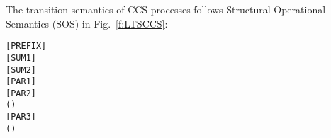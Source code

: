 The transition semantics of CCS processes follows Structural
Operational Semantics (SOS) in Fig.~\ref{f:LTSCCS}:
\begin{alltt}
\HOLTokenTurnstile{}  \HOLTokenTransBegin{}\HOLTokenTransEnd {}\hfill\texttt{[PREFIX]}
\HOLTokenTurnstile{}  \HOLTokenTransBegin{}\HOLTokenTransEnd {} \HOLSymConst{\HOLTokenImp{}}  \HOLSymConst{\ensuremath{+}}  \HOLTokenTransBegin{}\HOLTokenTransEnd {}\hfill\texttt{[SUM1]}
\HOLTokenTurnstile{}  \HOLTokenTransBegin{}\HOLTokenTransEnd {} \HOLSymConst{\HOLTokenImp{}}  \HOLSymConst{\ensuremath{+}}  \HOLTokenTransBegin{}\HOLTokenTransEnd {}\hfill\texttt{[SUM2]}
\HOLTokenTurnstile{}  \HOLTokenTransBegin{}\HOLTokenTransEnd {} \HOLSymConst{\HOLTokenImp{}}  \HOLSymConst{\ensuremath{\parallel}}  \HOLTokenTransBegin{}\HOLTokenTransEnd {} \HOLSymConst{\ensuremath{\parallel}} \hfill\texttt{[PAR1]}
\HOLTokenTurnstile{}  \HOLTokenTransBegin{}\HOLTokenTransEnd {} \HOLSymConst{\HOLTokenImp{}}  \HOLSymConst{\ensuremath{\parallel}}  \HOLTokenTransBegin{}\HOLTokenTransEnd {} \HOLSymConst{\ensuremath{\parallel}} \hfill\texttt{[PAR2]}
\HOLTokenTurnstile{}  \HOLTokenTransBegin{} \HOLTokenTransEnd {} \HOLSymConst{\HOLTokenConj{}}  \HOLTokenTransBegin{} ( )\HOLTokenTransEnd {} \HOLSymConst{\HOLTokenImp{}}
    \HOLSymConst{\ensuremath{\parallel}}  \HOLTokenTransBegin\HOLSymConst{\ensuremath{\tau}}\HOLTokenTransEnd {} \HOLSymConst{\ensuremath{\parallel}} \hfill\texttt{[PAR3]}
\HOLTokenTurnstile{}  \HOLTokenTransBegin{}\HOLTokenTransEnd {} \HOLSymConst{\HOLTokenConj{}} ( \HOLSymConst{=} \HOLSymConst{\ensuremath{\tau}} \HOLSymConst{\HOLTokenDisj{}}  \HOLSymConst{=}   \HOLSymConst{\HOLTokenConj{}}  \HOLSymConst{\HOLTokenNotIn{}}  \HOLSymConst{\HOLTokenConj{}}   \HOLSymConst{\HOLTokenNotIn{}} ) \HOLSymConst{\HOLTokenImp{}}

\end{alltt}
